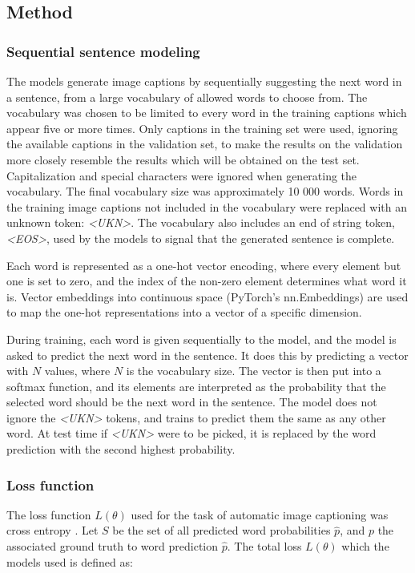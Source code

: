 \documentclass[a4paper, twoside]{article}
\begin{document}
\subsection{Method}
\subsubsection{Sequential sentence modeling}
The models generate image captions by sequentially suggesting the next word in a sentence, from a large vocabulary of allowed words to choose from. The vocabulary was chosen to be limited to every word in the training captions which appear five or more times. Only captions in the training set were used, ignoring the available captions in the validation set, to make the results on the validation more closely resemble the results which will be obtained on the test set. Capitalization and special characters were ignored when generating the vocabulary. The final vocabulary size was approximately 10 000 words. Words in the training image captions not included in the vocabulary were replaced with an unknown token: \textit{<UKN>}. The vocabulary also includes an end of string token, \textit{<EOS>}, used by the models to signal that the generated sentence is complete.

Each word is represented as a one-hot vector encoding, where every element but one is set to zero, and the index of the non-zero element determines what word it is. Vector embeddings into continuous space (PyTorch's nn.Embeddings) \cite{pytorch} are used to map the one-hot representations into a vector of a specific dimension.

During training, each word is given sequentially to the model, and the model is asked to predict the next word in the sentence. It does this by predicting a vector with $N$ values, where $N$ is the vocabulary size. The vector is then put into a softmax function, and its elements are interpreted as the probability that the selected word should be the next word in the sentence. The model does not ignore the \textit{<UKN>} tokens, and trains to predict them the same as any other word. At test time if \textit{<UKN>} were to be picked, it is replaced by the word prediction with the second highest probability.

\subsubsection{Loss function}
The loss function $L(\theta)$ used for the task of automatic image captioning was cross entropy \cite{notesonbackprop} \cite{cs231n}. Let $S$ be the set of all predicted word probabilities $\hat{p}$, and $p$ the associated ground truth to word prediction $\hat{p}$. The total loss $L(\theta)$ which the models used is defined as:
\end{document}
